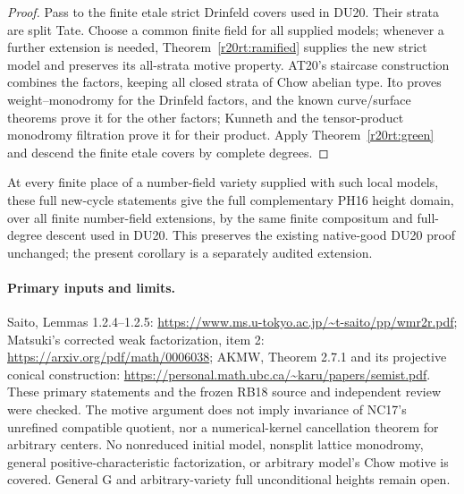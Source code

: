 \begin{proof}
Pass to the finite etale strict Drinfeld covers used in
DU20.  Their strata are split Tate.  Choose a common finite
field for all supplied models; whenever a further extension
is needed, Theorem~\ref{r20rt:ramified} supplies the new
strict model and preserves its all-strata motive property.
AT20's staircase construction combines the factors, keeping
all closed strata of Chow abelian type.  Ito proves
weight--monodromy for the Drinfeld factors, and the known
curve/surface theorems prove it for the other factors;
Kunneth and the tensor-product monodromy filtration prove
it for their product.  Apply Theorem~\ref{r20rt:green}
and descend the finite etale covers by complete degrees.
\end{proof}

At every finite place of a number-field variety supplied
with such local models, these full new-cycle statements
give the full complementary PH16 height domain, over
all finite number-field extensions, by the same finite
compositum and full-degree descent used in DU20.
This preserves the existing native-good DU20 proof unchanged;
the present corollary is a separately audited extension.

\paragraph{Primary inputs and limits.}
Saito, Lemmas 1.2.4--1.2.5:
\url{https://www.ms.u-tokyo.ac.jp/~t-saito/pp/wmr2r.pdf};
Matsuki's corrected weak factorization, item 2:
\url{https://arxiv.org/pdf/math/0006038};
AKMW, Theorem 2.7.1 and its projective conical construction:
\url{https://personal.math.ubc.ca/~karu/papers/semist.pdf}.
These primary statements and the frozen RB18 source and
independent review were checked.  The motive argument does
not imply invariance of NC17's unrefined compatible quotient,
nor a numerical-kernel cancellation theorem for arbitrary
centers.  No nonreduced initial model, nonsplit lattice
monodromy, general positive-characteristic factorization,
or arbitrary model's Chow motive is covered.  General G
and arbitrary-variety full unconditional heights remain open.
